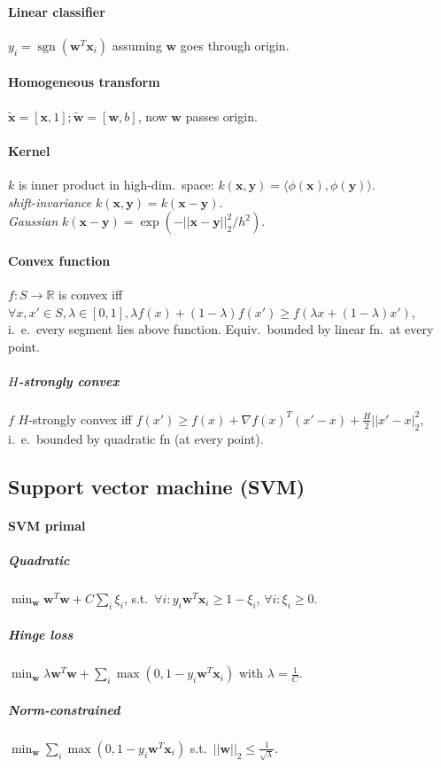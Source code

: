\documentclass[11pt]{scrartcl}
\DeclareMathOperator{\sign}{sgn}
\newcommand{\R}{\mathbb{R}}
\begin{document}
\begin{multicols}{3}
\paragraph{Linear classifier} $y_i = \sign(\bm w^T\bm x_i)$ assuming $\bm w$ goes through origin.
\paragraph{Homogeneous transform} $\tilde{\bm x} = [\bm x, 1]; \tilde{\bm w} = [\bm w, b]$, now $\bm w$ passes origin.
\paragraph{Kernel}
$k$ is inner product in high-dim.\ space: $k(\bm x,\bm y) = \langle\phi(\bm x),\phi(\bm y)\rangle$.\\
\emph{shift-invariance} $k(\bm x,\bm y) = k(\bm x - \bm y)$. \\
\emph{Gaussian} $k(\bm x - \bm y) = \exp(-||\bm x - \bm y||_2^2/h^2)$.

\paragraph{Convex function} $f: S \rightarrow \R$ is convex iff $\forall x,x'\in S, \lambda \in [0,1], \lambda f(x) + (1-\lambda)f(x') \geq f(\lambda x + (1-\lambda)x')$, i.\ e.\ every segment lies above function. Equiv.\ bounded by linear fn.\ at every point.
\subparagraph{$H$-strongly convex} $f$ $H$-strongly convex iff $f(x') \geq f(x) + \nabla f(x)^T(x'-x)+\frac{H}{2}||x'-x|_2^2$, i.\ e.\ bounded by quadratic fn (at every point).
\subsection{Support vector machine (SVM)}
\paragraph{SVM primal}
\subparagraph{Quadratic} $\min_{\bm w} \bm w^T \bm w + C\sum_{i}\xi_i$,
s.t.\ $\forall i: y_i\bm w^T \bm x_i \geq 1 - \xi_i$, $\forall i: \xi_i\geq 0$.
\subparagraph{Hinge loss}
$\min_{\bm w} \lambda \bm w^T \bm w + \sum_{i}\max(0,1-y_i\bm w^T \bm x_i)$ with $\lambda = \frac{1}{C}$.
\subparagraph{Norm-constrained}
$\min_{\bm w} \sum_{i}\max(0,1-y_i\bm w^T\bm x_i)$ s.t.\ $||\bm w||_2 \leq \frac{1}{\sqrt \lambda}$.

\end{multicols}
\end{document}
